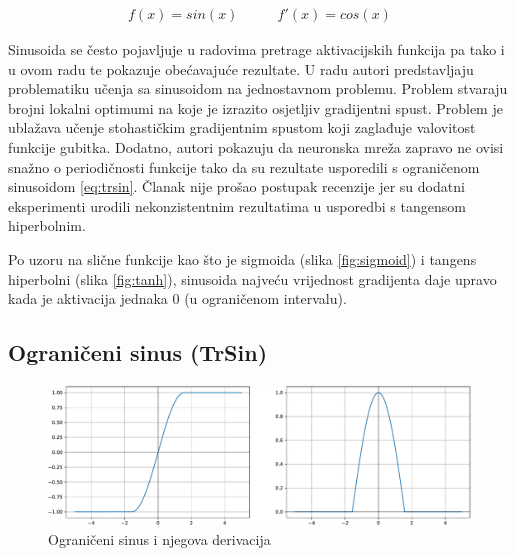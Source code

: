 \documentclass[times, utf8, numeric, diplomski]{fer}
\def\figref#1{(slika \ref{#1})}
\def\TODO#1{\noindent\textcolor{red}{TODO: \textit{#1}}\newline}
\def\todo#1{\TODO{#1}}
\begin{document}
\begin{equation}
\label{eq:sin}
\begin{split}
f(x) = sin(x)
\end{split}
\qquad
\begin{split}
f'(x) = cos(x)
\end{split}
\end{equation}


Sinusoida se često pojavljuje u radovima pretrage aktivacijskih funkcija \citep{elish} pa tako i u ovom radu te pokazuje obećavajuće rezultate. U radu \citet{taming_waves} autori predstavljaju problematiku učenja sa sinusoidom na jednostavnom problemu. Problem stvaraju brojni lokalni optimumi na koje je izrazito osjetljiv gradijentni spust. Problem je ublažava učenje stohastičkim gradijentnim spustom koji zaglađuje valovitost funkcije gubitka. Dodatno, autori pokazuju da neuronska mreža zapravo ne ovisi snažno o periodičnosti funkcije tako da su rezultate usporedili s ograničenom sinusoidom \eqref{eq:trsin}. Članak nije prošao postupak recenzije jer su dodatni eksperimenti urodili nekonzistentnim rezultatima u usporedbi s tangensom hiperbolnim.

Po uzoru na slične funkcije kao što je sigmoida \figref{fig:sigmoid} i tangens hiperbolni \figref{fig:tanh}, sinusoida najveću vrijednost gradijenta daje upravo kada je aktivacija jednaka 0 (u ograničenom intervalu).

\subsection{Ograničeni sinus (TrSin)}
\label{func:trsin}

\begin{figure}[H]
\includegraphics[width=\textwidth]{TrSin.pdf}
\centering
\caption{Ograničeni sinus i njegova derivacija}
\label{fig:trsin}
\end{figure}
\end{document}
